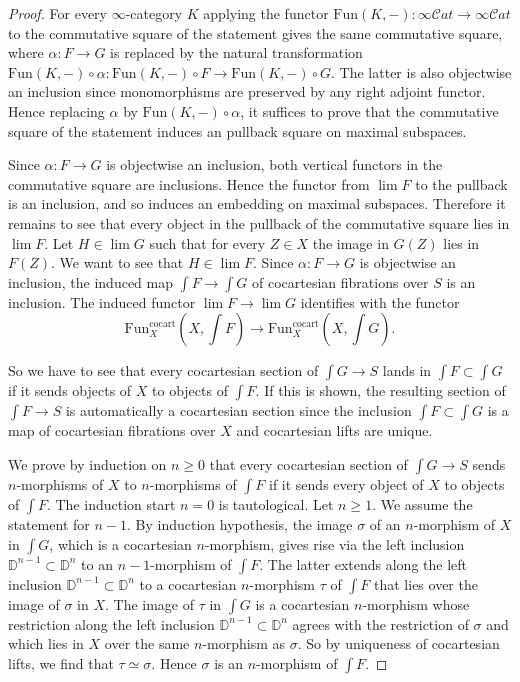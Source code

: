 \documentclass[10pt,oneside]{article}
\numberwithin{equation}{section} %
\numberwithin{figure}{section} %
\theoremstyle{plain}
\theoremstyle{definition}
\newcommand{\bD}{{\mathbb D}}
\newcommand{\Fun}{\mathrm{Fun}}
\newcommand{\cocart}{{\mathrm{cocart}}}
\newcommand{\scat}{\mathcal{C}\mathit{at}}
\begin{document}
\begin{proof}

For every $\infty$-category $K$ applying the functor
$\Fun(K,-): \infty\scat \to \infty\scat$ to the commutative square of the statement gives the same commutative square, where
$\alpha: F \to G$ is replaced by the natural transformation $\Fun(K,-) \circ \alpha: \Fun(K,-) \circ F \to \Fun(K,-) \circ G.$
The latter is also objectwise an inclusion
since monomorphisms are preserved by any right adjoint functor. 
Hence replacing $\alpha$ by $\Fun(K,-) \circ \alpha$, it suffices to prove that the commutative square of the statement 
induces an pullback square on maximal subspaces. 

Since $\alpha: F \to G$ is objectwise an inclusion, both vertical functors in the commutative square are inclusions.
Hence the functor from $\lim F$ to the pullback is an inclusion, and so induces an embedding on maximal subspaces. 
Therefore it remains to see that every object in the pullback of the commutative square lies in $\lim F$.
Let $H \in \lim G$ such that for every $Z \in X $ the image in $G(Z)$ lies in $F(Z)$. We want to see that $H \in \lim F$.
Since $\alpha: F \to G$ is objectwise an inclusion, the induced map $\int F \to \int G$ of cocartesian fibrations over $S$ is an inclusion.
The induced functor $\lim F \to \lim G$ identifies with the functor
$$ \Fun^\cocart_X(X, \int F) \to  \Fun^\cocart_X(X, \int G).$$

So we have to see that every cocartesian section of $\int G \to S$
lands in $\int F \subset \int G$ if it sends objects of $X$ to objects of $\int F. $
If this is shown, the resulting section of $\int F \to S$ is automatically a cocartesian section since the inclusion
$\int F \subset \int G$ is a map of cocartesian fibrations over $X$ and cocartesian lifts are unique. 

We prove by induction on $n \geq 0$ that every cocartesian section of $\int G \to S$ sends $n$-morphisms of $X$ to $n$-morphisms of $\int F$ if it sends every object of $X$ to objects of $\int F.$
The induction start $n=0$ is tautological. 
Let $n \geq 1$. We assume the statement for $n-1.$
By induction hypothesis, the image $\sigma$ of an $n$-morphism of $X$ in $\int G $, which is a cocartesian $n$-morphism, gives rise via the left inclusion $\bD^{n-1} \subset \bD^n$ to an $n-1$-morphism of $\int F.$
The latter extends along the left inclusion $\bD^{n-1} \subset \bD^n$ to a cocartesian $n$-morphism $\tau$ of $\int F$
that lies over the image of $\sigma$ in $X$.
The image of $\tau$ in $\int G$ is a cocartesian $n$-morphism whose restriction along the left inclusion $\bD^{n-1} \subset \bD^n$ agrees with the restriction of $\sigma$ and which lies in $X$ over the same $n$-morphism as $\sigma.$
So by uniqueness of cocartesian lifts, we find that $\tau \simeq \sigma.$ Hence $\sigma$ is an $n$-morphism of $\int F.$
\end{proof}
\end{document}
